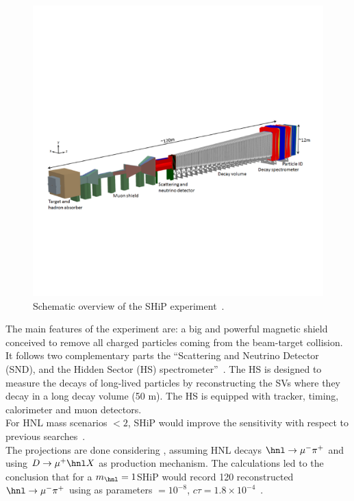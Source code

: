 \begin{figure}[h!]
\centering
    \includegraphics[clip,trim=0.3cm 5cm 1.cm 7cm, width=.75\textwidth]{Figures/c7/ship.pdf}
\caption{Schematic overview of the SHiP experiment~\cite{CERN-SHiP-NOTE-2018-001}.
}
\label{fig:ship1}
\end{figure}

The main features of the experiment are: a big and powerful 
magnetic shield conceived to remove all charged particles
coming from the beam-target collision. It follows two complementary parts the ``Scattering and Neutrino
Detector (SND), and the Hidden Sector (HS)
spectrometer''~\cite{CERN-SHiP-NOTE-2018-001}. The HS is designed to
measure the decays of long-lived particles by reconstructing the SVs
where they decay in a long decay volume (50 m). The HS is equipped with 
tracker, timing, calorimeter and muon detectors. \\
For HNL mass scenarios $<2$\GeV, SHiP would improve the sensitivity
with respect to previous searches~\cite{bonivento2013proposal}.\\
The projections are done considering \mixparm, assuming HNL decays $\hnl
\rightarrow \mu^{-} \pi^{+}$ and using $D
\rightarrow \mu^{+} \hnl X$ as production mechanism. The calculations
led to the conclusion that for a $m_\hnl = 1$\GeV SHiP would record
120 reconstructed $\hnl
\rightarrow \mu^{-} \pi^{+}$ using as parameters \mixparm $= 10^{-8}$,
$c\tau = 1.8 \times 10^{-4}$~\cite{bonivento2013proposal}. \\

